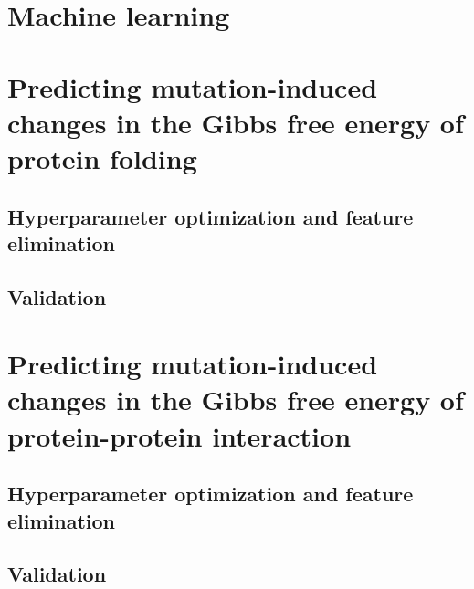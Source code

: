 \section{Machine learning}





\clearpage

\section{Predicting mutation-induced changes in the Gibbs free energy of protein folding}

\subsection{Hyperparameter optimization and feature elimination}

\subsection{Validation}







\section{Predicting mutation-induced changes in the Gibbs free energy of protein-protein interaction}

\subsection{Hyperparameter optimization and feature elimination}

\subsection{Validation}

\clearpage
